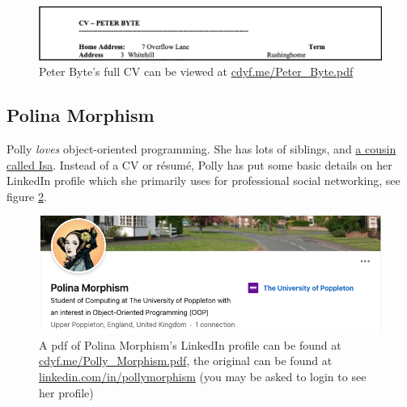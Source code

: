 \documentclass[
]{book}
\begin{document}
\begin{figure}

{\centering \includegraphics[width=1\linewidth]{images/peter_byte} 

}

\caption{Peter Byte's full CV can be viewed at \href{https://www.cdyf.me/Peter_Byte.pdf}{cdyf.me/Peter\_Byte.pdf}}\label{fig:peterbyte-fig}
\end{figure}



\hypertarget{polly-morphism}{%
\subsection{Polina Morphism}\label{polly-morphism}}

Polly \emph{loves} object-oriented programming. She has lots of siblings, and \href{https://en.wikipedia.org/wiki/Isomorphism}{a cousin called Isa}. Instead of a CV or résumé, Polly has put some basic details on her LinkedIn profile which she primarily uses for professional social networking, see figure \ref{fig:polly-fig}.

\begin{figure}

{\centering \includegraphics[width=1\linewidth]{images/polly-morphism} 

}

\caption{A pdf of Polina Morphism's LinkedIn profile can be found at \href{https://www.cdyf.me/Polly_Morphism.pdf}{cdyf.me/Polly\_Morphism.pdf}, the original can be found at \href{https://www.linkedin.com/in/pollymorphism/}{linkedin.com/in/pollymorphism} (you may be asked to login to see her profile)}\label{fig:polly-fig}
\end{figure}
\end{document}
